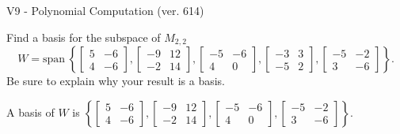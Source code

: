 \begin{exercise}
  \begin{exerciseTitle}V9 - Polynomial Computation (ver. 614)\end{exerciseTitle}
  \begin{exerciseStatement}
    Find a basis for the subspace of \(M_{2,2}\) 
\[W=\mathrm{span}\ \left\{\left[\begin{array}{cc}
5 & -6 \\
4 & -6
\end{array}\right] , \left[\begin{array}{cc}
-9 & 12 \\
-2 & 14
\end{array}\right] , \left[\begin{array}{cc}
-5 & -6 \\
4 & 0
\end{array}\right] , \left[\begin{array}{cc}
-3 & 3 \\
-5 & 2
\end{array}\right] , \left[\begin{array}{cc}
-5 & -2 \\
3 & -6
\end{array}\right]\right\}.\]
 Be sure to explain why your result is a basis.


  \end{exerciseStatement}
  \begin{exerciseAnswer}
   A basis of \(W\) is  \(\left\{\left[\begin{array}{cc}
5 & -6 \\
4 & -6
\end{array}\right] , \left[\begin{array}{cc}
-9 & 12 \\
-2 & 14
\end{array}\right] , \left[\begin{array}{cc}
-5 & -6 \\
4 & 0
\end{array}\right] , \left[\begin{array}{cc}
-5 & -2 \\
3 & -6
\end{array}\right]\right\}\).
  


  \end{exerciseAnswer}
\end{exercise}